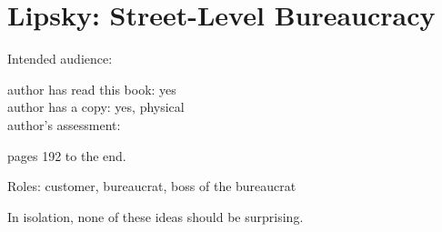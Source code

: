 \section{Lipsky: Street-Level Bureaucracy\label{review:lipsky_street}}

\cite{1983_Lipsky}

Intended audience:

author has read this book: yes\\
author has a copy: yes, physical\\
author's assessment:


pages 192 to the end.

Roles: customer, bureaucrat, boss of the bureaucrat

In isolation, none of these ideas should be surprising.
